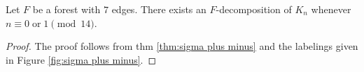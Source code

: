 
\resize{}{}

\begin{thm}\label{thm:0 or 1 mod 14}
    Let $F$ be a forest with $7$ edges. There exists an $F$-decomposition of $K_n$ whenever $n \equiv 0 \; \textrm{or} \; 1 \pmod{14}.$
\end{thm}
\begin{proof}
    The proof follows from thm \ref{thm:sigma plus minus} and the labelings given in Figure \ref{fig:sigma plus minus}.
\end{proof}